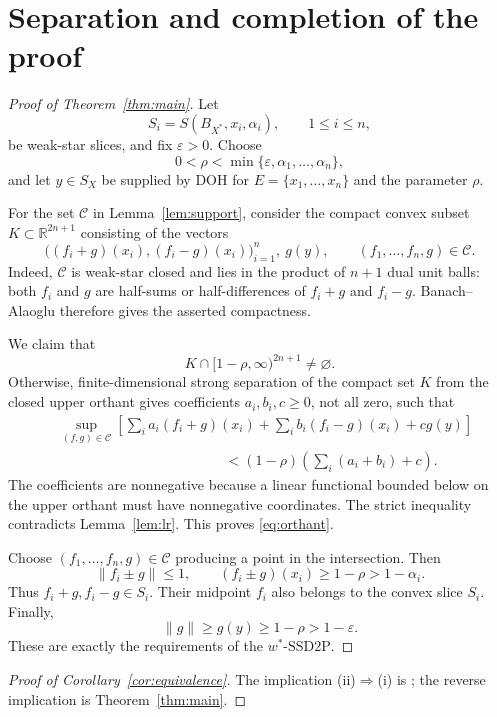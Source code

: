 \documentclass[11pt]{article}
\newcommand{\R}{\mathbb R}
\newcommand{\DOH}{\mathrm{DOH}}
\newcommand{\wSSD}{w^*\text{-}\mathrm{SSD2P}}
\begin{document}
\section{Separation and completion of the proof}

\begin{proof}[Proof of Theorem~\ref{thm:main}]
Let
\[
 S_i=S(B_{X^*},x_i,\alpha_i),\qquad 1\le i\le n,
\]
be weak-star slices, and fix $\varepsilon>0$.  Choose
\[
 0<\rho<\min\{\varepsilon,\alpha_1,\ldots,\alpha_n\},
\]
and let $y\in S_X$ be supplied by $\DOH$ for
$E=\{x_1,\ldots,x_n\}$ and the parameter $\rho$.

For the set $\mathcal C$ in Lemma~\ref{lem:support}, consider the compact
convex subset $K\subset\R^{2n+1}$ consisting of the vectors
\[
 \bigl((f_i+g)(x_i),(f_i-g)(x_i)\bigr)_{i=1}^n,\ g(y),
 \qquad (f_1,\ldots,f_n,g)\in\mathcal C.
\]
Indeed, $\mathcal C$ is weak-star closed and lies in the product of
$n+1$ dual unit balls: both $f_i$ and $g$ are half-sums or
half-differences of $f_i+g$ and $f_i-g$.  Banach--Alaoglu therefore gives
the asserted compactness.

We claim that
\begin{equation}\label{eq:orthant}
 K\cap[1-\rho,\infty)^{2n+1}\ne\varnothing.
\end{equation}
Otherwise, finite-dimensional strong separation of the compact set $K$
from the closed upper orthant gives coefficients
$a_i,b_i,c\ge0$, not all zero, such that
\begin{align*}
 &\sup_{(f,g)\in\mathcal C}
 \left[\sum_i a_i(f_i+g)(x_i)
      +\sum_i b_i(f_i-g)(x_i)+c g(y)\right]\\
 &\hspace{5cm}<
 (1-\rho)\left(\sum_i(a_i+b_i)+c\right).
\end{align*}
The coefficients are nonnegative because a linear functional bounded
below on the upper orthant must have nonnegative coordinates.  The strict
inequality contradicts Lemma~\ref{lem:lr}.  This proves
\eqref{eq:orthant}.

Choose $(f_1,\ldots,f_n,g)\in\mathcal C$ producing a point in the
intersection.  Then
\[
 \|f_i\pm g\|\le1,\qquad
 (f_i\pm g)(x_i)\ge1-\rho>1-\alpha_i.
\]
Thus $f_i+g,f_i-g\in S_i$.  Their midpoint $f_i$ also belongs to the
convex slice $S_i$.  Finally,
\[
 \|g\|\ge g(y)\ge1-\rho>1-\varepsilon.
\]
These are exactly the requirements of the $\wSSD$.
\end{proof}

\begin{proof}[Proof of Corollary~\ref{cor:equivalence}]
The implication \textup{(ii)}$\Rightarrow$\textup{(i)} is
\cite[Proposition~2.1]{Ostrak}; the reverse implication is
Theorem~\ref{thm:main}.
\end{proof}
\end{document}
